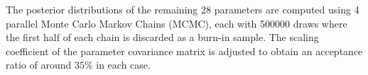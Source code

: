 \documentclass[12pt]{article}
\numberwithin{equation}{section}
\begin{document}
The posterior distributions of the remaining 28 parameters are computed using 4 parallel Monte Carlo Markov Chains (MCMC), each with 500000 draws where the first half of each chain is discarded as a burn-in sample. The scaling coefficient of the parameter covariance matrix is adjusted to obtain an acceptance ratio of around $35 \%$ in each case. 
 

\end{document}
